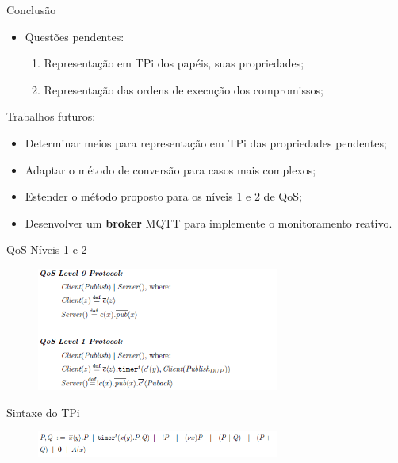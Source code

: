\documentclass[12pt,xcolor={usenames,dvipsnames}]{beamer}
\begin{document}
\begin{frame}{Conclusão}
	\begin{itemize}
		\item Questões pendentes:
			\begin{enumerate}
				\item Representação em TPi dos papéis, suas propriedades;
				\item Representação das ordens de execução dos compromissos;
			\end{enumerate}
	\end{itemize}
	Trabalhos futuros:
	\begin{itemize}
		\item Determinar meios para representação em TPi das propriedades pendentes;
		\item Adaptar o método de conversão para casos mais complexos;
		\item Estender o método proposto para os níveis 1 e 2 de QoS;
		\item Desenvolver um \textbf{broker} MQTT para implemente o monitoramento reativo.
	\end{itemize}
\end{frame}

\frame{\titlepage}

\begin{frame}{QoS Níveis 1 e 2}
	\begin{figure}[ht]
		\centering
		\includegraphics[width=8cm]{./figuras/mqtt_model.png}
	\end{figure}
\end{frame}

\begin{frame}{Sintaxe do TPi}
		\begin{figure}[ht]
		\centering
		\includegraphics[width=8cm]{./figuras/tpi_syntax.png}
	\end{figure}
\end{frame}

%
\end{document}
